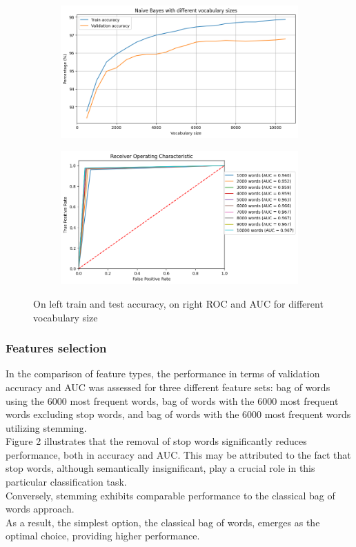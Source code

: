 \documentclass{class}
\begin{document}
\begin{figure}[h]
    \begin{subfigure}{.5\linewidth}
        \includegraphics[width=\linewidth]{images/naive_voc_size.png}
    \end{subfigure}%
    \begin{subfigure}{.5\linewidth}
        \includegraphics[width=\linewidth]{images/naive_voc_size_ROC.png}
    \end{subfigure}
    \caption{On left train and test accuracy, on right ROC and AUC for different vocabulary size}
    \label{fig-1}
\end{figure}
\subsubsection*{Features selection}
In the comparison of feature types, the performance in terms of validation accuracy and AUC was assessed for three different feature sets:
bag of words using the 6000 most frequent words, bag of words with the 6000 most frequent words excluding stop words,
and bag of words with the 6000 most frequent words utilizing stemming.\\
Figure 2 illustrates that the removal of stop words significantly reduces performance, both in accuracy and AUC.
This may be attributed to the fact that stop words, although semantically insignificant, play a crucial role in this particular classification task.\\
Conversely, stemming exhibits comparable performance to the classical bag of words approach.\\
As a result, the simplest option, the classical bag of words, emerges as the optimal choice, providing higher performance.
\end{document}
